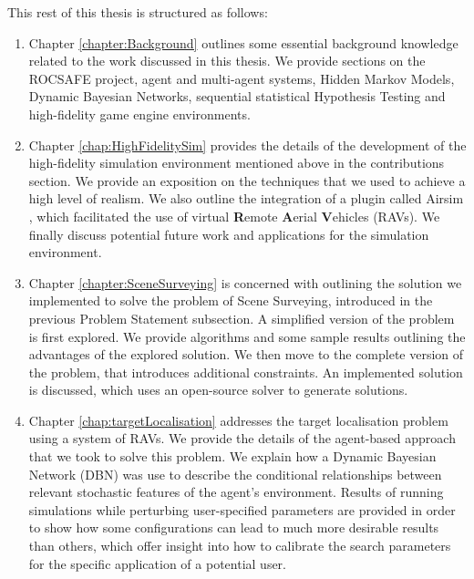 This rest of this thesis is structured as follows: 
\begin{enumerate}
    \item Chapter \ref{chapter:Background} outlines some essential background knowledge related to the work discussed in this thesis. We provide sections on the ROCSAFE project, agent and multi-agent systems, Hidden Markov Models, Dynamic Bayesian Networks, sequential statistical Hypothesis Testing and high-fidelity game engine environments. 
    \item Chapter \ref{chap:HighFidelitySim} provides the details of the development of the high-fidelity simulation environment mentioned above in the contributions section. We provide an exposition on the techniques that we used to achieve a high level of realism. We also outline the integration of a plugin called Airsim \cite{Shah2017AirSim:Vehicles}, which facilitated the use of virtual \textbf{R}emote \textbf{A}erial \textbf{V}ehicles (RAVs). We finally discuss potential future work and applications for the simulation environment.
    \item Chapter \ref{chapter:SceneSurveying} is concerned with outlining the solution we implemented to solve the problem of Scene Surveying, introduced in the previous Problem Statement subsection. A simplified version of the problem is first explored. We provide algorithms and some sample results outlining the advantages of the explored solution. We then move to the complete version of the problem, that introduces additional constraints. An implemented solution is discussed, which uses an open-source solver to generate solutions. 
    \item Chapter \ref{chap:targetLocalisation} addresses the target localisation problem using a system of RAVs. We provide the details of the agent-based approach that we took to solve this problem. We explain how a Dynamic Bayesian Network (DBN) was use to describe the conditional relationships between relevant stochastic features of the agent's environment. Results of running simulations while perturbing user-specified parameters are provided in order to show how some configurations can lead to much more desirable results than others, which offer insight into how to calibrate the search parameters for the specific application of a potential user.
    
\end{enumerate}